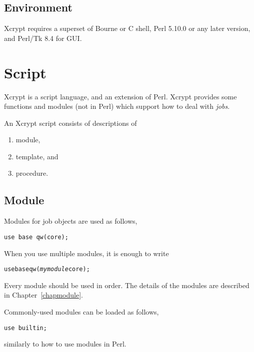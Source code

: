 \documentclass[a4paper,10pt]{report}
\begin{document}
\section{Environment}

Xcrypt requires a superset of Bourne or C shell, Perl 5.10.0 or any
later version, and Perl/Tk 8.4 for GUI.

\chapter{Script}

Xcrypt is a script language, and an extension of Perl.  Xcrypt provides
some functions and modules (not in Perl) which support how to deal
with \textit{jobs}.

An Xcrypt script consists of descriptions of
\begin{enumerate}
 \item module,
 \item template, and
 \item procedure.
\end{enumerate}

\section{Module}

Modules for job objects are used as follows,
\begin{boxnote}
\begin{verbatim}
use base qw(core);
\end{verbatim}
\end{boxnote}
\vspace{\baselineskip}

When you use multiple modules, it is enough to write
\begin{boxnote}
\begin{alltt}
use base qw(\textit{mymodule} core);
\end{alltt}
\end{boxnote}
\vspace{\baselineskip}
\noindent
Every module should be used in order.
The details of the modules are described in Chapter~\ref{chapmodule}.

Commonly-used modules can be loaded as follows,
\begin{boxnote}
\begin{verbatim}
use builtin;
\end{verbatim}
\end{boxnote}
\vspace{\baselineskip}
\noindent
similarly to how to use modules in Perl.
\end{document}
